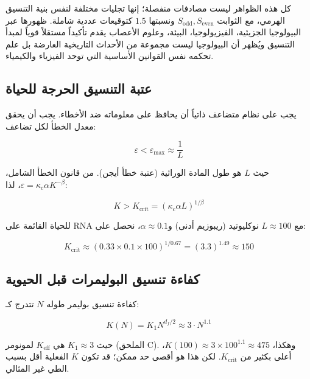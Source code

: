 \documentclass[11pt,a4paper]{article}
\newcommand{\Keff}{K_{\mathrm{eff}}}
\newcommand{\kappac}{\kappa_c}
\newcommand{\eps}{\varepsilon}
\newcommand{\df}{d_{\!f}}
\begin{document}
	كل هذه الظواهر ليست مصادفات منفصلة؛ إنها تجليات مختلفة لنفس بنية التنسيق الهرمي، مع الثوابت \(S_{\mathrm{odd}}, S_{\mathrm{even}}\) ونسبتها \(1.5\) كتوقيعات عددية شاملة. ظهورها عبر البيولوجيا الجزيئية، الفيزيولوجيا، البيئة، وعلوم الأعصاب يقدم تأكيداً مستقلاً قوياً لمبدأ التنسيق ويُظهر أن البيولوجيا ليست مجموعة من الأحداث التاريخية العارضة بل علم تحكمه نفس القوانين الأساسية التي توحد الفيزياء والكيمياء.
	
	\subsection{عتبة التنسيق الحرجة للحياة}
	
	يجب على نظام متضاعف ذاتياً أن يحافظ على معلوماته ضد الأخطاء. يجب أن يحقق معدل الخطأ لكل تضاعف:
	
	\begin{equation}
		\eps < \eps_{\text{max}} \approx \frac{1}{L}
		\label{eq:error-threshold}
	\end{equation}
	
	حيث \(L\) هو طول المادة الوراثية (عتبة خطأ أيجن). من قانون الخطأ الشامل، \(\eps = \kappac \alpha K^{-\beta}\)، لذا:
	
	\begin{equation}
		K > K_{\text{crit}} = \left( \kappac \alpha L \right)^{1/\beta}
		\label{eq:Kcrit-life}
	\end{equation}
	
	للحياة القائمة على RNA مع \(L \approx 100\) نوكليوتيد (ريبوزيم أدنى) و\(\alpha \approx 0.1\)، نحصل على:
	
	\begin{equation}
		K_{\text{crit}} \approx (0.33 \times 0.1 \times 100)^{1/0.67} = (3.3)^{1.49} \approx 150
		\label{eq:Kcrit-life-num}
	\end{equation}
	
	\subsection{كفاءة تنسيق البوليمرات قبل الحيوية}
	
	كفاءة تنسيق بوليمر طوله \(N\) تتدرج كـ:
	
	\begin{equation}
		K(N) = K_1 N^{\df/2} \approx 3 \cdot N^{1.1}
		\label{eq:K-polymer}
	\end{equation}
	
	حيث \(K_1 \approx 3\) هي \(\Keff\) لمونومر (الملحق C). وهكذا، \(K(100) \approx 3 \times 100^{1.1} \approx 475\)، أعلى بكثير من \(K_{\text{crit}}\). لكن هذا هو أقصى حد ممكن؛ قد تكون \(K\) الفعلية أقل بسبب الطي غير المثالي.
	
\end{document}
